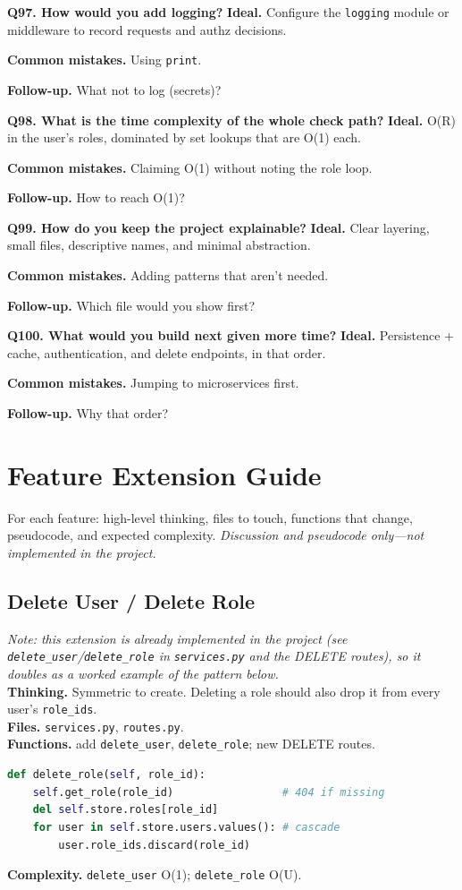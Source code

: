 \documentclass[11pt,a4paper]{report}
\newcommand{\qa}[3]{%
  \textbf{Ideal.} #1\par
  \textbf{Common mistakes.} #2\par
  \textbf{Follow-up.} #3\par
  \vspace{4pt}
}
\begin{document}
\textbf{Q97. How would you add logging?}
\qa{Configure the \texttt{logging} module or middleware to record requests and
authz decisions.}
{Using \texttt{print}.}
{What not to log (secrets)?}

\textbf{Q98. What is the time complexity of the whole check path?}
\qa{O(R) in the user's roles, dominated by set lookups that are O(1) each.}
{Claiming O(1) without noting the role loop.}
{How to reach O(1)?}

\textbf{Q99. How do you keep the project explainable?}
\qa{Clear layering, small files, descriptive names, and minimal abstraction.}
{Adding patterns that aren't needed.}
{Which file would you show first?}

\textbf{Q100. What would you build next given more time?}
\qa{Persistence + cache, authentication, and delete endpoints, in that order.}
{Jumping to microservices first.}
{Why that order?}

\chapter{Feature Extension Guide}

For each feature: high-level thinking, files to touch, functions that change,
pseudocode, and expected complexity. \emph{Discussion and pseudocode only---not
implemented in the project.}

\section{Delete User / Delete Role}
\emph{Note: this extension is already implemented in the project (see
\texttt{delete\_user}/\texttt{delete\_role} in \texttt{services.py} and the
DELETE routes), so it doubles as a worked example of the pattern below.}\\
\textbf{Thinking.} Symmetric to create. Deleting a role should also drop it from
every user's \texttt{role\_ids}.\\
\textbf{Files.} \texttt{services.py}, \texttt{routes.py}.\\
\textbf{Functions.} add \texttt{delete\_user}, \texttt{delete\_role}; new DELETE
routes.
\begin{lstlisting}[language=Python]
def delete_role(self, role_id):
    self.get_role(role_id)                 # 404 if missing
    del self.store.roles[role_id]
    for user in self.store.users.values(): # cascade
        user.role_ids.discard(role_id)
\end{lstlisting}
\textbf{Complexity.} \texttt{delete\_user} O(1); \texttt{delete\_role} O(U).
\end{document}
